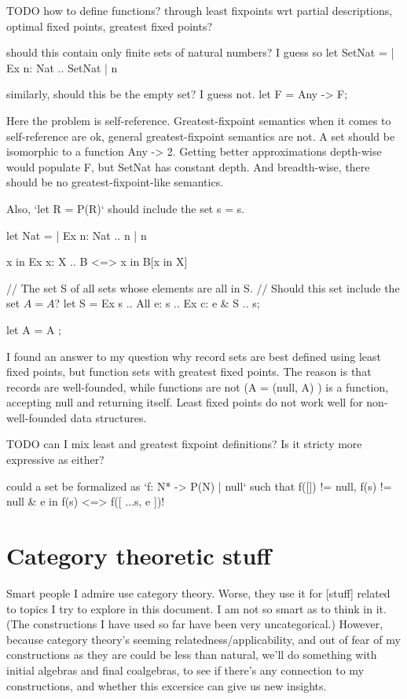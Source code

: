 \documentclass[oneside,12pt]{book}
\newcounter{question}
\theoremstyle{definition}
\theoremstyle{remark}
\begin{document}
TODO how to define functions?
through least fixpoints wrt partial descriptions, optimal fixed points,
greatest fixed points?

should this contain only finite sets of natural numbers? I guess so
let SetNat = {{}} | Ex n: Nat .. { SetNat | { n } }

similarly, should this be the empty set? I guess not.
let F = Any -> F;

Here the problem is self-reference. Greatest-fixpoint semantics when it comes
to self-reference are ok, general greatest-fixpoint semantics are not.
A set should be isomorphic to a function Any -> 2. Getting better approximations
depth-wise would populate F, but SetNat has constant depth. And breadth-wise,
there should be no greatest-fixpoint-like semantics.

Also, `let R = P(R)` should include the set s = {s}.

let Nat = {{}} | Ex n: Nat .. n | { n }

x in Ex x: X .. B <=> x in B[x in X]

// The set S of all sets whose elements are all in S.
// Should this set include the set $A = {A}$?
let S = Ex s .. All e: s .. Ex c: { e } \& S .. s;

let A = { A };

I found an answer to my question why record sets are best defined
using least fixed points, but function sets with greatest fixed points.
The reason is that records are well-founded, while functions are not
(A = { (null, A) }) is a function, accepting null and returning itself.
Least fixed points do not work well for non-well-founded data structures.

TODO can I mix least and greatest fixpoint definitions? Is it stricty more
expressive as either?

could a set be formalized as `f: N* -> P(N) | null` such that
f([]) != null,
f(s) != null \& e in f(s) <=> f([ ...s, e ])!

\section{Category theoretic stuff}
Smart people I admire use category theory. Worse, they use it for [stuff]
related to topics I try to explore in this document. I am not so smart as to
think in it. (The constructions I have used so far have been very uncategorical.)
However, because category theory's seeming relatedness/applicability, and out
of fear of my constructions as they are could be less than natural, we'll do
something with initial algebras and final coalgebras, to see if there's any
connection to my constructions, and whether this excersice can give us new insights.
\end{document}
